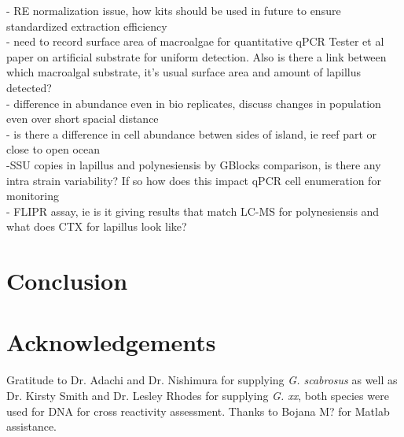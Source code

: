 \documentclass[12pt]{article}
\begin{document}
- RE normalization issue, how kits should be used in future to ensure standardized extraction efficiency\\
- need to record surface area of macroalgae for quantitative qPCR Tester et al paper on artificial substrate for uniform detection. Also is there a link between which macroalgal substrate, it's usual surface area and amount of lapillus detected?\\
- difference in abundance even in bio replicates, discuss changes in population even over short spacial distance\\
- is there a difference in cell abundance betwen sides of island, ie reef part or close to open ocean\\
-SSU copies in lapillus and polynesiensis by GBlocks comparison, is there any intra strain variability? If so how does this impact qPCR cell enumeration for monitoring\\
- FLIPR assay, ie is it giving results that match LC-MS for polynesiensis and what does CTX for lapillus look like?
\newpage
\section{Conclusion}
\section{Acknowledgements}
Gratitude to Dr. Adachi and Dr. Nishimura for supplying \emph{G. scabrosus} as well as Dr. Kirsty Smith and Dr. Lesley Rhodes for supplying \emph{G. xx}, both species were used for DNA for cross reactivity assessment. Thanks to Bojana M? for Matlab assistance.
\FloatBarrier
\newpage


\end{document}
